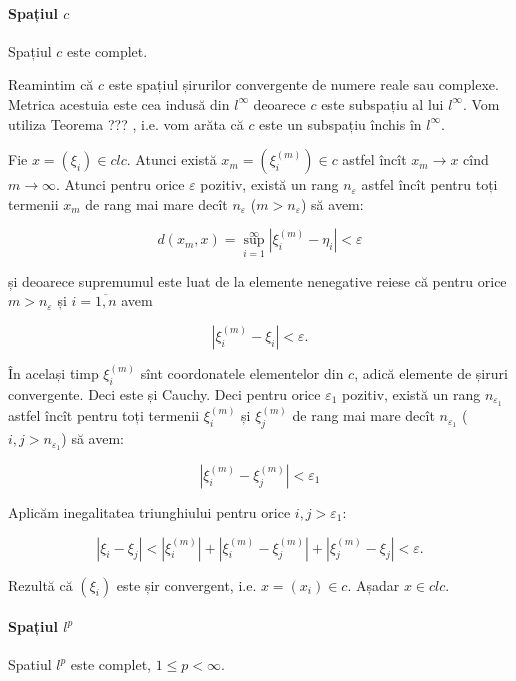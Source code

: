 \documentclass[a4paper,12pt]{article}
\theoremstyle{change}
\newenvironment{proof}{{\bf Demonstrație:} }{}
\begin{document}
\paragraph{Spațiul $c$} Spațiul $c$ este complet. 

\begin{proof}
Reamintim că $c$ este spațiul șirurilor convergente de numere reale sau complexe.
Metrica acestuia este cea indusă din $l^\infty$ deoarece $c$ este subspațiu al lui $l^\infty$.
Vom utiliza Teorema ??? , i.e. vom arăta că $c$ este un subspațiu închis în $l^\infty$.

Fie $x=(\xi_i)\in cl c$. Atunci există $x_m=(\xi_i^{(m)})\in c$ astfel încît $x_m\to x$ cînd $m\to\infty$. Atunci pentru orice $\varepsilon$ pozitiv, există un rang $n_{\varepsilon}$ astfel încît pentru toți termenii $x_m$ de rang mai mare decît $n_{\varepsilon}$ ($m>n_{\varepsilon}$) să avem:

\[
  d(x_m,x) = \sup_{i=1}^{\infty} |\xi_i^{(m)} - \eta_i| < \varepsilon
\]

și deoarece supremumul este luat de la elemente nenegative reiese că pentru orice $m>n_\varepsilon$ și $i=\overline{1,n}$ avem

\[
|\xi_i^{(m)} - \xi_i| < \varepsilon.
\]

În același timp $\xi_i^{(m)}$ sînt coordonatele elementelor din $c$, adică elemente de șiruri convergente. Deci este și Cauchy. Deci pentru orice $\varepsilon_1$ pozitiv, există un rang $n_{\varepsilon_1}$ astfel încît pentru toți termenii $\xi_i^{(m)}$ și $\xi_j^{(m)}$ de rang mai mare decît $n_{\varepsilon_1}$ ($i,j>n_{\varepsilon_1}$) să avem:

\[
|\xi_i^{(m)}-\xi_j^{(m)}|<\varepsilon_1
\]

Aplicăm inegalitatea triunghiului pentru orice $i,j>\varepsilon_1$:

\[
|\xi_i-\xi_j|<|\xi_i^{(m)}|+|\xi_i^{(m)}-\xi_j^{(m)}|+|\xi_j^{(m)}-\xi_j|<\varepsilon.
\]

Rezultă că $(\xi_i)$ este șir convergent, i.e. $x=(x_i)\in c$. Așadar $x\in cl c$.
\end{proof}

\paragraph{Spațiul $l^p$} Spatiul $l^p$ este complet, $1\leq p<\infty$.
\end{document}
